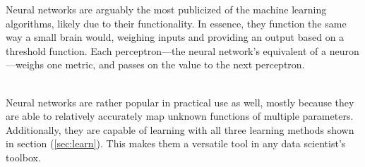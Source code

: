 \documentclass[a4paper]{comjnl}
\numberwithin{equation}{subsection}
\begin{document}
            Neural networks are arguably the most publicized of the machine learning algorithms,
            likely due to their functionality. In essence, they function the same way a small brain
            would, weighing inputs and providing an output based on a threshold function. Each
            perceptron---the neural network's equivalent of a neuron---weighs one metric, and
            passes on the value to the next perceptron.
            \\[0.5cm]
            \\[0.5cm]
            Neural networks are rather popular in practical use as well, mostly because they
            are able to relatively accurately map unknown functions of multiple parameters.
            Additionally, they are capable of learning with all three learning methods shown in
            section (\ref{sec:learn}). This makes them a versatile tool in any data scientist's
            toolbox.
\end{document}

